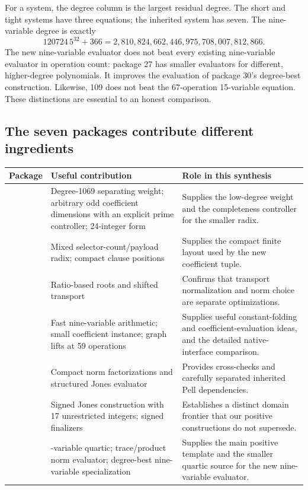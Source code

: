 \documentclass[11pt]{article}
\begin{document}
For a system, the degree column is the largest residual degree. The short
and tight systems have three equations; the inherited system has seven. The
nine-variable degree is exactly
\[
 120724\,5^{32}+366
 =2,810,824,662,446,975,708,007,812,866.
\]
The new nine-variable evaluator does not beat every existing nine-variable
evaluator in operation count: package 27 has smaller evaluators for different,
higher-degree polynomials. It improves the evaluation of package 30's
degree-best construction. Likewise, 109 does not beat the 67-operation
15-variable equation. These distinctions are essential to an honest comparison.

\subsection{The seven packages contribute different ingredients}

\begin{longtable}{@{}>{\raggedright\arraybackslash}p{}>{\raggedright\arraybackslash}p{}>{\raggedright\arraybackslash}p{}@{}}
\toprule
Package & Useful contribution & Role in this synthesis\\
\midrule
\endhead
24 & Degree-1069 separating weight; arbitrary odd coefficient dimensions with
an explicit prime controller; 24-integer form & Supplies the low-degree weight
and the completeness controller for the smaller radix.\\
25 & Mixed selector-count/payload radix; compact clause positions & Supplies
the compact finite layout used by the new coefficient tuple.\\
26 & Ratio-based roots and shifted transport & Confirms that transport
normalization and norm choice are separate optimizations.\\
27 & Fast nine-variable arithmetic; small coefficient instance; graph lifts
at 59 operations & Supplies useful constant-folding and coefficient-evaluation
ideas, and the detailed native-interface comparison.\\
28 & Compact norm factorizations and structured Jones evaluator & Provides
cross-checks and carefully separated inherited Pell dependencies.\\
29 & Signed Jones construction with 17 unrestricted integers; signed finalizers
& Establishes a distinct domain frontier that our positive constructions do
not supersede.\\
30 & 31-variable quartic; trace/product norm evaluator; degree-best
nine-variable specialization & Supplies the main positive template and the
smaller quartic source for the new nine-variable evaluator.\\
\bottomrule
\end{longtable}
\end{document}
